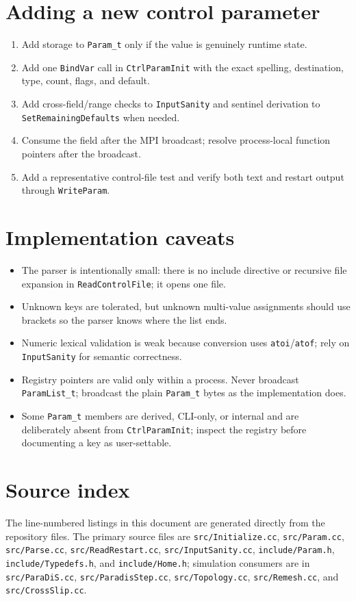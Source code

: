 \documentclass[11pt]{article}
\newcommand{\code}[1]{\texorpdfstring{\nolinkurl{#1}}{#1}}
\newcommand{\srcfile}[1]{\texorpdfstring{\nolinkurl{#1}}{#1}}
\begin{document}
\section{Adding a new control parameter}
\begin{enumerate}
\item Add storage to \code{Param_t} only if the value is genuinely runtime state.
\item Add one \code{BindVar} call in \code{CtrlParamInit} with the exact spelling, destination, type, count, flags, and default.
\item Add cross-field/range checks to \code{InputSanity} and sentinel derivation to \code{SetRemainingDefaults} when needed.
\item Consume the field after the MPI broadcast; resolve process-local function pointers after the broadcast.
\item Add a representative control-file test and verify both text and restart output through \code{WriteParam}.
\end{enumerate}

\section{Implementation caveats}
\begin{itemize}
\item The parser is intentionally small: there is no include directive or recursive file expansion in \code{ReadControlFile}; it opens one file.
\item Unknown keys are tolerated, but unknown multi-value assignments should use brackets so the parser knows where the list ends.
\item Numeric lexical validation is weak because conversion uses \code{atoi}/\code{atof}; rely on \code{InputSanity} for semantic correctness.
\item Registry pointers are valid only within a process. Never broadcast \code{ParamList_t}; broadcast the plain \code{Param_t} bytes as the implementation does.
\item Some \code{Param_t} members are derived, CLI-only, or internal and are deliberately absent from \code{CtrlParamInit}; inspect the registry before documenting a key as user-settable.
\end{itemize}

\section{Source index}
The line-numbered listings in this document are generated directly from the repository files. The primary source files are \srcfile{src/Initialize.cc}, \srcfile{src/Param.cc}, \srcfile{src/Parse.cc}, \srcfile{src/ReadRestart.cc}, \srcfile{src/InputSanity.cc}, \srcfile{include/Param.h}, \srcfile{include/Typedefs.h}, and \srcfile{include/Home.h}; simulation consumers are in \srcfile{src/ParaDiS.cc}, \srcfile{src/ParadisStep.cc}, \srcfile{src/Topology.cc}, \srcfile{src/Remesh.cc}, and \srcfile{src/CrossSlip.cc}.
\end{document}
